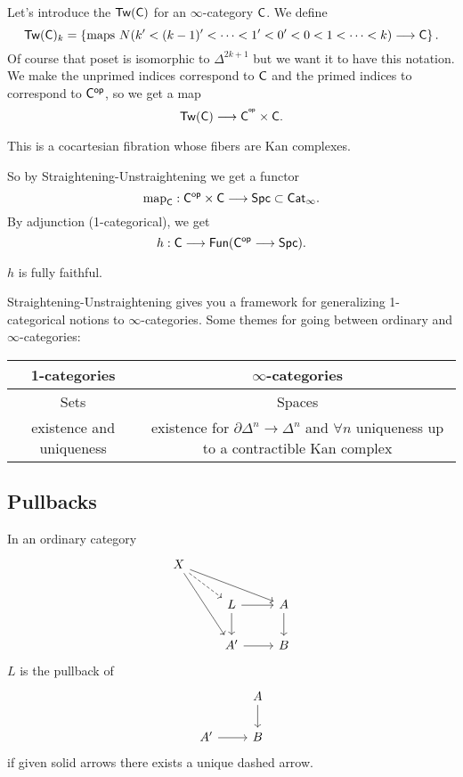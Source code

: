 Let's introduce the  $\mathsf{Tw}(\mathsf{C})$ for an $\infty$-category $\mathsf{C}$. We define
\[
	\cat{Tw}(\C)_k = \left\{ \text{maps }N(k'<(k-1)'<\dots<1'<0'<0<1<\dots<k)\to \C \right\} .
\] 
Of course that poset is isomorphic to $\Delta^{2k+1}$ but we want it to have this notation. We make the unprimed indices correspond to $\mathsf{C}$ and the primed indices to correspond to $\mathsf{C}^\mathsf{op}$, so we get a map
\[
	\cat{Tw}(\C) \to  \C^{\op}\times \C.
\] 
\begin{lemma}
	This is a cocartesian fibration whose fibers are Kan complexes.
\end{lemma}
So by Straightening-Unstraightening we get a functor
\[
	\map_\C : \C\op\times \C \to \cat{Spc} \subset \cat{Cat}_\infty.
\] 
By adjunction (1-categorical), we get
\[
	h:\C \to \cat{Fun}(\cat{C}\op\to \cat{Spc}).
\] 
\begin{theorem}
	$h$ is fully faithful.
\end{theorem}
\begin{remark}
	Straightening-Unstraightening gives you a framework for generalizing 1-categorical notions to $\infty$-categories. Some themes for going between ordinary and $\infty$-categories:
	\begin{table}[h]
		\centering
		\label{tab:themes}
		\begin{tabular}{c|c}
		1-categories & $\infty$-categories \\ \hline
		Sets & Spaces \\
		existence and uniqueness & existence for $\partial \Delta^{n}\to \Delta^{n}$ and $\forall n$ uniqueness up to a contractible Kan complex
		\end{tabular}
	\end{table}
\end{remark}

\subsection{Pullbacks}
In an ordinary category 
\[
\begin{tikzcd}
	X \ar[dr,dashed] \ar[drr] \ar[ddr] \\
	& L \ar[r] \ar[d] & A \ar[d] \\
	& A' \ar[r] & B
\end{tikzcd}
\] 
$L$ is the pullback of
\[
\begin{tikzcd}
	& A \ar[d] \\
	A' \ar[r] & B
\end{tikzcd}
\] 
if given solid arrows there exists a unique dashed arrow. 

